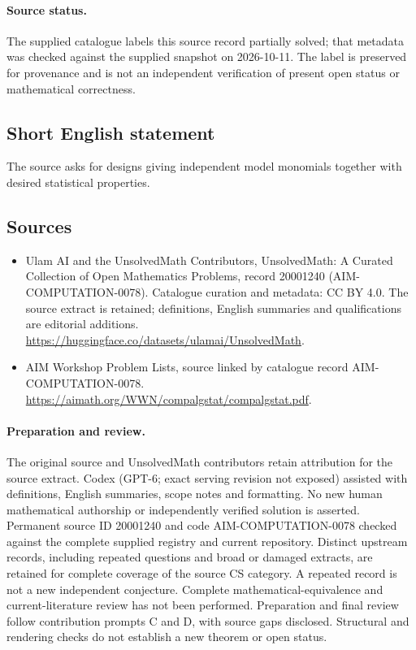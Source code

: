 \documentclass[11pt]{article}
\begin{document}
\paragraph{Source status.}
The supplied catalogue labels this source record partially solved; that metadata was checked against the supplied snapshot on 2026-10-11. The label is preserved for provenance and is not an independent verification of present open status or mathematical correctness.
\subsection{Short English statement}
The source asks for designs giving independent model monomials together with desired statistical properties.
\subsection{Sources}
\begin{itemize}
\item[\hypertarget{source:20001240:1}{S1}] Ulam AI and the UnsolvedMath Contributors, UnsolvedMath: A Curated Collection of Open Mathematics Problems, record 20001240 (AIM-COMPUTATION-0078). Catalogue curation and metadata: CC BY 4.0. The source extract is retained; definitions, English summaries and qualifications are editorial additions.
\url{https://huggingface.co/datasets/ulamai/UnsolvedMath}.
\item[\hypertarget{source:20001240:2}{S2}] AIM Workshop Problem Lists, source linked by catalogue record AIM-COMPUTATION-0078.
\url{https://aimath.org/WWN/compalgstat/compalgstat.pdf}.
\end{itemize}
\paragraph{Preparation and review.}
The original source and UnsolvedMath contributors retain attribution for the source extract. Codex (GPT-6; exact serving revision not exposed) assisted with definitions, English summaries, scope notes and formatting. No new human mathematical authorship or independently verified solution is asserted. Permanent source ID 20001240 and code AIM-COMPUTATION-0078 checked against the complete supplied registry and current repository. Distinct upstream records, including repeated questions and broad or damaged extracts, are retained for complete coverage of the source CS category. A repeated record is not a new independent conjecture. Complete mathematical-equivalence and current-literature review has not been performed. Preparation and final review follow contribution prompts C and D, with source gaps disclosed. Structural and rendering checks do not establish a new theorem or open status.
\label{end:20001240}
\end{document}
